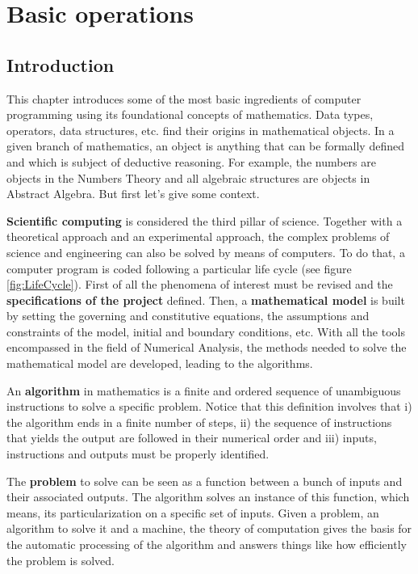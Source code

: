 \chapter{Basic operations} \label{chap:basicop}

    \section{Introduction} 
This chapter introduces some of the most basic ingredients of computer programming 
using its foundational concepts of mathematics.
Data types, operators, data structures, etc.
find their origins in mathematical objects.
In a given branch of mathematics, an object is anything that can be formally defined and 
which is subject of deductive reasoning. 
For example, the numbers are objects in the Numbers Theory and
all algebraic structures are objects in Abstract Algebra.
But first let's give some context. 

\textbf{Scientific computing} is considered the third pillar of science. 
Together with a theoretical approach and an experimental approach, 
the complex problems of science and engineering can also be solved 
by means of computers. 
To do that, a computer program is coded following a particular life cycle (see figure \ref{fig:LifeCycle}).
First of all the phenomena of interest must be revised and the \textbf{specifications of the project} defined. 
Then, a \textbf{mathematical model} is built by setting the governing and constitutive equations, the assumptions and constraints of the model, initial and boundary conditions, etc.
With all the tools encompassed in the field of Numerical Analysis, the methods needed to solve the mathematical model are developed, leading to the algorithms. 

An \textbf{algorithm} in mathematics is a finite and ordered sequence of unambiguous instructions to solve a specific problem. 
Notice that this definition involves that i) the algorithm ends in a finite number of steps, 
ii) the sequence of instructions that yields the output are followed in their numerical order and
iii) inputs, instructions and outputs must be properly identified. 

The \textbf{problem} to solve can be seen as a function between a bunch of inputs and their associated outputs.
The algorithm solves an instance of this function, which means, its particularization on a specific set of inputs.
Given a problem, an algorithm to solve it and a machine, 
the theory of computation gives the basis for the automatic processing of the algorithm
and answers things like how efficiently the problem is solved. 

